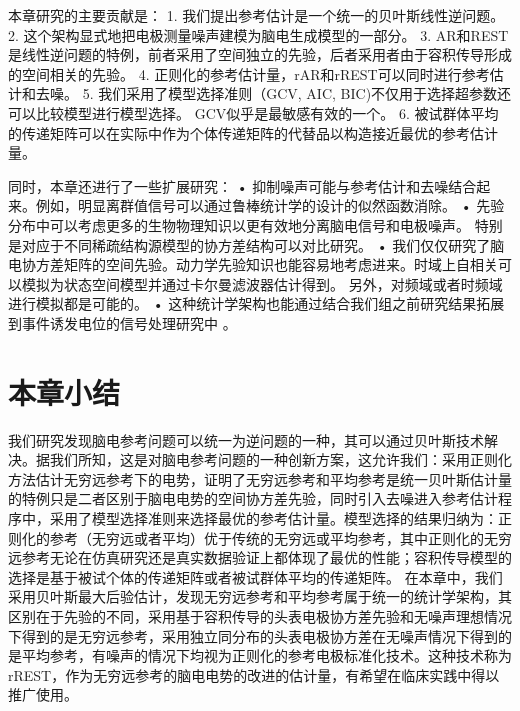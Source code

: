 本章研究的主要贡献是：
1. 我们提出参考估计是一个统一的贝叶斯线性逆问题。
2. 这个架构显式地把电极测量噪声建模为脑电生成模型的一部分。
3. AR和REST是线性逆问题的特例，前者采用了空间独立的先验，后者采用者由于容积传导形成的空间相关的先验。
4. 正则化的参考估计量，rAR和rREST可以同时进行参考估计和去噪。
5. 我们采用了模型选择准则（GCV, AIC, BIC)不仅用于选择超参数还可以比较模型进行模型选择。 GCV似乎是最敏感有效的一个。
6. 被试群体平均的传递矩阵可以在实际中作为个体传递矩阵的代替品以构造接近最优的参考估计量。

同时，本章还进行了一些扩展研究：
• 抑制噪声可能与参考估计和去噪结合起来。例如，明显离群值信号可以通过鲁棒统计学的设计的似然函数消除。
• 先验分布中可以考虑更多的生物物理知识以更有效地分离脑电信号和电极噪声。 特别是对应于不同稀疏结构源模型的协方差结构可以对比研究。
• 我们仅仅研究了脑电协方差矩阵的空间先验。动力学先验知识也能容易地考虑进来。时域上自相关可以模拟为状态空间模型并通过卡尔曼滤波器估计得到。 另外，对频域或者时频域进行模拟都是可能的。
• 这种统计学架构也能通过结合我们组之前研究结果拓展到事件诱发电位的信号处理研究中 。

\section{本章小结}
我们研究发现脑电参考问题可以统一为逆问题的一种，其可以通过贝叶斯技术解决。据我们所知，这是对脑电参考问题的一种创新方案，这允许我们：采用正则化方法估计无穷远参考下的电势，证明了无穷远参考和平均参考是统一贝叶斯估计量的特例只是二者区别于脑电电势的空间协方差先验，同时引入去噪进入参考估计程序中，采用了模型选择准则来选择最优的参考估计量。模型选择的结果归纳为：正则化的参考（无穷远或者平均）优于传统的无穷远或平均参考，其中正则化的无穷远参考无论在仿真研究还是真实数据验证上都体现了最优的性能；容积传导模型的选择是基于被试个体的传递矩阵或者被试群体平均的传递矩阵。
在本章中，我们采用贝叶斯最大后验估计，发现无穷远参考和平均参考属于统一的统计学架构，其区别在于先验的不同，采用基于容积传导的头表电极协方差先验和无噪声理想情况下得到的是无穷远参考，采用独立同分布的头表电极协方差在无噪声情况下得到的是平均参考，有噪声的情况下均视为正则化的参考电极标准化技术。这种技术称为rREST，作为无穷远参考的脑电电势的改进的估计量，有希望在临床实践中得以推广使用。